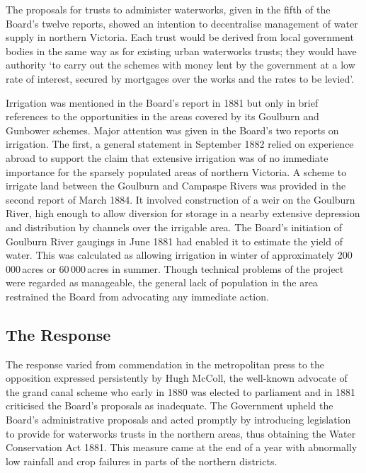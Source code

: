 The proposals for trusts  to
administer waterworks, given in the fifth of the Board's twelve
reports, showed an intention to decentralise management of water
supply in northern Victoria.  Each trust would be derived from local
government bodies in the same way as for existing urban waterworks
trusts; they would have authority `to carry out the schemes with money
lent by the government at a low rate of interest, secured by mortgages
over the works and the rates to be levied'.

Irrigation was mentioned in the Board's report in 1881 but only in
brief references to the opportunities in the areas covered by its
Goulburn and Gunbower schemes.  Major attention was given in the
Board's two reports on irrigation.  The first, a general statement in
September 1882 relied on experience abroad to support the claim that
extensive irrigation was of no immediate importance for the sparsely
populated areas of northern Victoria.  A scheme to irrigate land
between the Goulburn and Campaspe Rivers was provided in the second
report of March 1884. It involved construction of a weir on the
Goulburn River,   high
enough to allow diversion for storage in a nearby extensive depression
and distribution by channels over the irrigable area.  The Board's
initiation of Goulburn River gaugings in June 1881 had enabled it to
estimate the yield of water.  This was calculated as allowing
irrigation in winter of approximately 200\,000\,acres or
60\,000\,acres in summer.  Though technical problems of the project
were regarded as manageable, the general lack of population in the
area restrained the Board from advocating any immediate
action.

\subsection*{The Response}

The response varied from commendation in the metropolitan press to the
opposition expressed persistently by Hugh McColl, 
the well-known advocate of the grand canal scheme who early in 1880
was elected to parliament and in 1881 criticised the Board's proposals
as inadequate.  The Government upheld the Board's administrative
proposals and acted promptly by introducing legislation to provide for
waterworks trusts in the northern areas, thus obtaining the Water
Conservation Act 1881.  This measure came at the end of a year with abnormally low
rainfall and crop failures in parts of the northern
districts.

